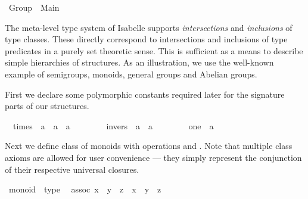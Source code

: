 %
\begin{isabellebody}%
\def\isabellecontext{Group}%
%
\isamarkuptrue%
\ Group\ {\isacharequal}\ Main{\isacharcolon}\isamarkupfalse%
%
\begin{isamarkuptext}%
\medskip\noindent The meta-level type system of Isabelle supports
  \emph{intersections} and \emph{inclusions} of type classes. These
  directly correspond to intersections and inclusions of type
  predicates in a purely set theoretic sense. This is sufficient as a
  means to describe simple hierarchies of structures.  As an
  illustration, we use the well-known example of semigroups, monoids,
  general groups and Abelian groups.%
\end{isamarkuptext}%
\isamarkuptrue%
%
\isamarkuptrue%
%
\begin{isamarkuptext}%
First we declare some polymorphic constants required later for the
  signature parts of our structures.%
\end{isamarkuptext}%
\isamarkuptrue%
\isanewline
\ \ times\ {\isacharcolon}{\isacharcolon}\ {\isachardoublequote}{\isacharprime}a\ {\isasymRightarrow}\ {\isacharprime}a\ {\isasymRightarrow}\ {\isacharprime}a{\isachardoublequote}\ \ \ \ {\isacharparenleft}\ {\isachardoublequote}{\isasymodot}{\isachardoublequote}\ {}{}{\isacharparenright}\isanewline
\ \ invers\ {\isacharcolon}{\isacharcolon}\ {\isachardoublequote}{\isacharprime}a\ {\isasymRightarrow}\ {\isacharprime}a{\isachardoublequote}\ \ \ \ {\isacharparenleft}{\isachardoublequote}{\isacharparenleft}{\isacharunderscore}{\isasyminv}{\isacharparenright}{\isachardoublequote}\ {\isacharbrackleft}{}{}{}{}{\isacharbrackright}\ {}{}{}{\isacharparenright}\isanewline
\ \ one\ {\isacharcolon}{\isacharcolon}\ {\isacharprime}a\ \ \ \ {\isacharparenleft}{\isachardoublequote}{\isasymone}{\isachardoublequote}{\isacharparenright}\isamarkupfalse%
%
\begin{isamarkuptext}%
\noindent Next we define class  of monoids with
  operations \isa{{\isasymodot}} and \isa{{\isasymone}}.  Note that multiple class
  axioms are allowed for user convenience --- they simply represent
  the conjunction of their respective universal closures.%
\end{isamarkuptext}%
\isamarkuptrue%
\ monoid\ {\isasymsubseteq}\ type\isanewline
\ \ assoc{\isacharcolon}\ {\isachardoublequote}{\isacharparenleft}x\ {\isasymodot}\ y{\isacharparenright}\ {\isasymodot}\ z\ {\isacharequal}\ x\ {\isasymodot}\ {\isacharparenleft}y\ {\isasymodot}\ z{\isacharparenright}{\isachardoublequote}\isanewline

\end{isabellebody}
